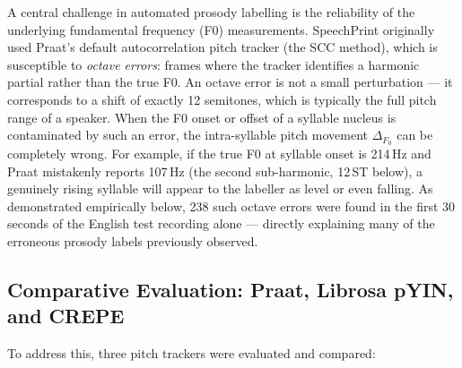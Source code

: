 A central challenge in automated prosody labelling is the reliability of the
underlying fundamental frequency (F0) measurements. SpeechPrint originally used
Praat's default autocorrelation pitch tracker (the SCC method), which is
susceptible to \emph{octave errors}: frames where the tracker identifies a
harmonic partial rather than the true F0. An octave error is not a small
perturbation --- it corresponds to a shift of exactly 12 semitones, which is
typically the full pitch range of a speaker. When the F0 onset or offset of a
syllable nucleus is contaminated by such an error, the intra-syllable pitch
movement $\Delta_{F_0}$ can be completely wrong. For example, if the true F0 at
syllable onset is 214\,Hz and Praat mistakenly reports 107\,Hz (the second
sub-harmonic, 12\,ST below), a genuinely rising syllable will appear to the
labeller as level or even falling. As demonstrated empirically below, 238 such
octave errors were found in the first 30 seconds of the English test recording
alone --- directly explaining many of the erroneous prosody labels previously
observed.

\subsection{Comparative Evaluation: Praat, Librosa pYIN, and CREPE}
\label{sec:tracker_comparison}

To address this, three pitch trackers were evaluated and compared:

